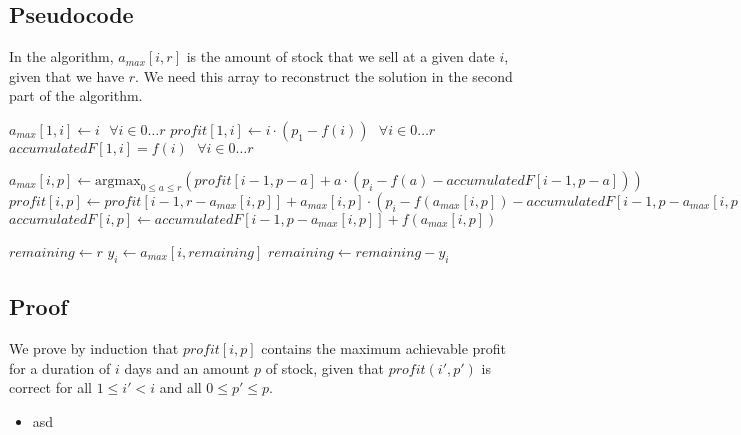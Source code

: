 \documentclass[12pt]{article}
\begin{document}
\subsection*{Pseudocode}
In the algorithm, $a_\mathit{max}[i, r]$ is the amount of stock that we sell at a given date $i$, given that we have $r$. We need this array to reconstruct the solution in the second part of the algorithm.

\begin{algorithmic}
	\State $a_\mathit{max}[1, i] \gets i \mbox{   } \forall i \in 0 \ldots r$
	\State $\mathit{profit}[1, i] \gets i \cdot (p_1 - f(i)) \mbox{   } \forall i \in 0 \ldots r$
	\State $\mathit{accumulatedF}[1, i] = f(i) \mbox{   } \forall i \in 0 \ldots r$

			\State $a_{\mathit{max}}[i, p] \gets \mbox{argmax}_{0 \leq a \leq r} (\mathit{profit}[i-1, p-a] + a \cdot (p_i - f(a) - \mathit{accumulatedF}[i-1, p-a]))$
			\State $\mathit{profit}[i, p] \gets \mathit{profit}[i-1, r-a_{\mathit{max}}[i, p]] + a_\mathit{max}[i,p] \cdot (p_i - f(a_\mathit{max}[i,p]) - \mathit{accumulatedF}[i-1, p-a_\mathit{max}[i,p]])$
			\State $\mathit{accumulatedF}[i, p] \gets \mathit{accumulatedF}[i-1, p-a_\mathit{max}[i,p]] + f(a_\mathit{max}[i,p])$
		\EndFor
	\EndFor

	\State $\mathit{remaining} \gets r$
		\State $y_i \gets a_\mathit{max}[i, \mathit{remaining}]$
		\State $\mathit{remaining} \gets \mathit{remaining} - y_i$
	\EndFor
\end{algorithmic}

\subsection*{Proof}
We prove by induction that $\mathit{profit}[i, p]$ contains the maximum achievable profit for a duration of $i$ days and an amount $p$ of stock, given that $\mathit{profit}(i', p')$ is correct for all $1 \leq i' < i$ and all $0 \leq p' \leq p$.
\begin{itemize}
	\item asd	
\end{itemize}
\end{document}
